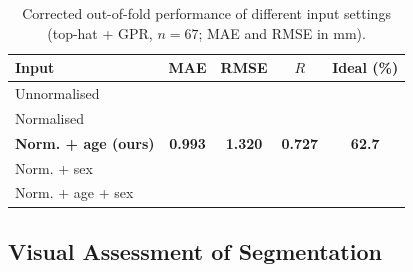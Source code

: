 \begin{table}[t]
\centering
\caption{Corrected out-of-fold performance of different input settings (top-hat + GPR, $n=67$; MAE and RMSE in mm).}
\label{tab:inputs}
\small\setlength{\tabcolsep}{3pt}
\begin{tabular}{@{}lcccc@{}}
\toprule
Input & MAE & RMSE & $R$ & Ideal (\%) \\
\midrule
Unnormalised & \tbd{} & \tbd{} & \tbd{} & \tbd{} \\
Normalised & \tbd{} & \tbd{} & \tbd{} & \tbd{} \\
\textbf{Norm. + age (ours)} & \textbf{0.993} & \textbf{1.320} & \textbf{0.727} & \textbf{62.7} \\
Norm. + sex & \tbd{} & \tbd{} & \tbd{} & \tbd{} \\
Norm. + age + sex & \tbd{} & \tbd{} & \tbd{} & \tbd{} \\
\bottomrule
\end{tabular}
\end{table}

\subsection{Visual Assessment of Segmentation}
